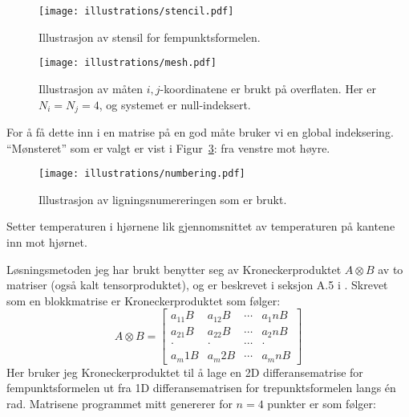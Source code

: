 \begin{figure}[htbp]
  \centering
  \texttt{[image: illustrations/stencil.pdf]}
  \caption{Illustrasjon av stensil for fempunktsformelen.}
  \label{fig:stencil}
\end{figure}

\begin{figure}[htbp]
  \centering
  \texttt{[image: illustrations/mesh.pdf]}
  \caption{Illustrasjon av måten $i,j$-koordinatene er brukt på overflaten. Her er $N_i=N_j=4$, og systemet er null-indeksert.}
  \label{fig:indexing}
\end{figure}

For å få dette inn i en matrise på en god måte bruker vi en global indeksering. ``Mønsteret'' som er valgt er vist i Figur~\ref{fig:numbering}: fra venstre mot høyre.

\begin{figure}[htbp]
  \centering
  \texttt{[image: illustrations/numbering.pdf]}
  \caption{Illustrasjon av ligningsnumereringen som er brukt.}
  \label{fig:numbering}
\end{figure}

Setter temperaturen i hjørnene lik  gjennomsnittet av temperaturen på kantene inn mot hjørnet.

Løsningsmetoden jeg har brukt benytter seg av Kroneckerproduktet $A\otimes B$ av to matriser (også kalt tensorproduktet), og er beskrevet i seksjon A.5 i \cite{strang}. Skrevet som en blokkmatrise er Kroneckerproduktet som følger:
\begin{equation}
  A \otimes B =
  \begin{bmatrix}
    a_11 B & a_12 B & \cdots & a_1n B \\
    a_21 B & a_22 B & \cdots & a_2n B \\
    \cdot  & \cdot  & \cdots & \cdot  \\
    a_m1 B & a_m2 B & \cdots & a_mn B
  \end{bmatrix}
\end{equation}
Her bruker jeg Kroneckerproduktet til å lage en 2D differansematrise for fempunktsformelen ut fra 1D differansematrisen for trepunktsformelen langs én rad. Matrisene programmet mitt genererer for $n=4$ punkter er som følger:

